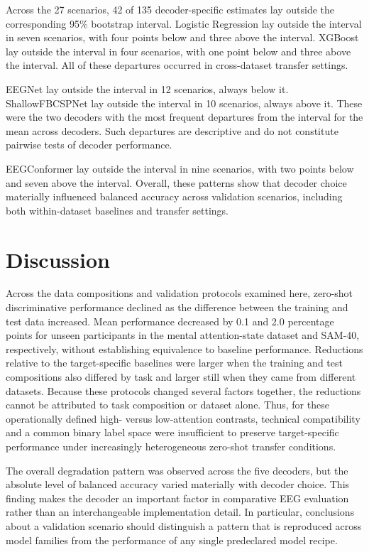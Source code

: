 \documentclass[10pt,letterpaper]{article}
\begin{document}


Across the 27 scenarios, 42 of 135 decoder-specific estimates lay outside the
corresponding 95\% bootstrap interval. Logistic Regression lay outside the
interval in seven scenarios, with four points below and three above the
interval. XGBoost lay outside the interval in four scenarios, with one point
below and three above the interval. All of these departures occurred in
cross-dataset transfer settings.

EEGNet lay outside the interval in 12 scenarios, always below it.
ShallowFBCSPNet lay outside the interval in 10 scenarios, always above it.
These were the two decoders with the most frequent departures from the
interval for the mean across decoders. Such departures are descriptive and
do not constitute pairwise tests of decoder performance.

EEGConformer lay outside the interval in nine scenarios, with two points below
and seven above the interval. Overall, these patterns show that decoder choice
materially influenced balanced accuracy across validation scenarios, including
both within-dataset baselines and transfer settings.

\section*{Discussion}

Across the data compositions and validation protocols examined here, zero-shot
discriminative performance declined as the difference between the training and
test data increased. Mean performance decreased by 0.1 and 2.0 percentage points for unseen
participants in the mental attention-state dataset and SAM-40, respectively,
without establishing equivalence to baseline performance. Reductions relative
to the target-specific baselines were larger when the training and test
compositions also differed by task and larger still when they came from
different datasets. Because these protocols changed several factors together,
the reductions cannot be attributed to task composition or dataset alone. Thus, for these operationally defined high- versus
low-attention contrasts, technical compatibility and a common binary label space
were insufficient to preserve target-specific performance under increasingly
heterogeneous zero-shot transfer conditions.

\medskip

The overall degradation pattern was observed across the five decoders, but the
absolute level of balanced accuracy varied materially with decoder choice.
This finding makes the decoder an important factor in comparative EEG
evaluation rather than an interchangeable implementation detail. In
particular, conclusions about a validation scenario should distinguish a
pattern that is reproduced across model families from the performance of any
single predeclared model recipe.
\end{document}
